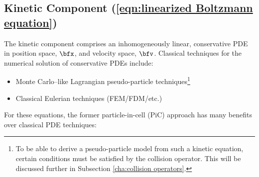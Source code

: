 \subsection*{Kinetic Component (\ref{eqn:linearized Boltzmann equation})}
    The kinetic component comprises an inhomogeneously linear, conservative PDE in position space, $\bfx$, and velocity space, $\bfv$. Classical techniques for the numerical solution of conservative PDEs include:
    \begin{itemize}
        \item  Monte Carlo--like Lagrangian pseudo-particle techniques\footnote{To be able to derive a pseudo-particle model from such a kinetic equation, certain conditions must be satisfied by the collision operator. This will be discussed further in Subsection \ref{cha:collision operators}.}
        \item  Classical Eulerian techniques (FEM/FDM/etc.)
    \end{itemize}
    For these equations, the former particle-in-cell (PiC) approach has many benefits over classical PDE techniques: 
